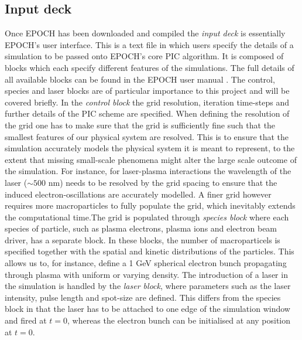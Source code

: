 \subsection{Input deck}
Once EPOCH has been downloaded and compiled the  \textit{input deck} is essentially EPOCH's user interface. This is a text file in which users specify the details of a simulation to be passed onto EPOCH's core PIC algorithm. It is composed of blocks which each specify different features of the simulations. The full details of all available blocks can be found in the EPOCH user manual \cite{Bennett2015}. The control, species and laser blocks are of particular importance to this project and will be covered briefly.  In the \textit{control block} the grid resolution, iteration time-steps and further details of the PIC scheme are specified. When defining the resolution of the grid one has to make sure that the grid is sufficiently fine such that the smallest features of our physical system are resolved. This is to ensure that the simulation accurately models the physical system it is meant to represent, to the extent that missing small-scale phenomena might alter the large scale outcome of the simulation. For instance, for laser-plasma interactions the wavelength of the laser ($\sim 500$ nm) needs to be resolved by the grid spacing to ensure that the induced electron-oscillations are accurately modelled. A finer grid however requires more macroparticles to fully populate the grid, which inevitably extends the computational time.The grid is populated through \textit{species block} where each species of particle, such as plasma electrons, plasma ions and electron beam driver, has a separate block. In these blocks, the number of macroparticels is specified together with the spatial and kinetic distributions of the particles. This allows us to, for instance, define a 1 GeV spherical electron bunch propagating through plasma with uniform or varying density. The introduction of a laser in the simulation is handled by the \textit{laser block}, where parameters such as the laser intensity, pulse length and spot-size are defined. This differs from the species block in that the laser has to be attached to one edge of the simulation window and fired at $t=0$, whereas the electron bunch can be initialised at any position at $t=0$. \\
